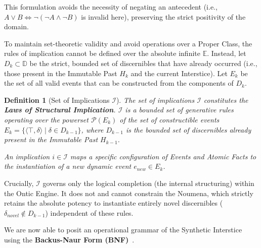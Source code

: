 \documentclass[11pt, a4paper]{article}
\theoremstyle{formalism}
\newtheorem{formalism}{Definition}
\begin{document}
This formulation avoids the necessity of negating an antecedent (i.e., $A \lor
B \iff \neg(\neg A \land \neg B)$ is invalid here), preserving the strict
positivity of the domain. 

To maintain set-theoretic validity and avoid operations over a Proper Class, the 
rules of implication cannot be defined over the absolute infinite $\mathbb{E}$. 
Instead, let $D_k \subset \mathbb{D}$ be the strict, bounded set of discernibles 
that have already occurred (i.e., those present in the Immutable Past $H_k$ and 
the current Interstice). Let $E_k$ be the set of all valid events that can be 
constructed from the components of $D_k$. 

\begin{formalism}[Set of Implications $\mathcal{I}$]

    The set of implications $\mathcal{I}$ constitutes the \textbf{Laws of
    Structural Implication}. $\mathcal{I}$ is a bounded set of generative rules
    operating over the powerset $\mathcal{P}(E_k)$ of the set of constructible
    events $E_k = \{ \langle \top, \delta \rangle \mid \delta \in D_{k-1} \}$,
    where $D_{k-1}$ is the bounded set of discernibles already present in the
    Immutable Past $H_{k-1}$. 
    
    An implication $i \in \mathcal{I}$ maps a specific configuration of Events
    and Atomic Facts to the instantiation of a new dynamic event $e_{new} \in
    E_k$.

\end{formalism}

Crucially, $\mathcal{I}$ governs only the logical completion (the internal
structuring) within the Ontic Engine. It does not and cannot constrain the Noumena,
which strictly retains the absolute potency to instantiate entirely novel
discernibles ($\delta_{novel} \notin D_{k-1}$) independent of these rules.

We are now able to posit an operational grammar of the Synthetic Interstice
using the \textbf{Backus-Naur Form (BNF)}~\cite{Backus1959}.
\end{document}
